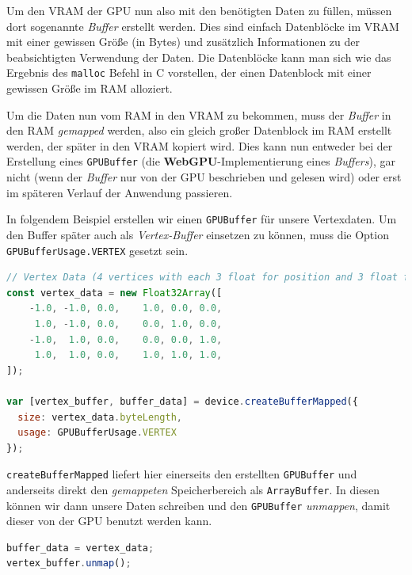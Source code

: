 \documentclass[oneside]{ausarbeitung}
\begin{document}
Um den VRAM der \ac{GPU} nun also mit den benötigten Daten zu füllen, müssen dort sogenannte \textit{Buffer} erstellt werden. Dies sind einfach Datenblöcke im VRAM mit einer gewissen Größe (in Bytes) und zusätzlich Informationen zu der beabsichtigten Verwendung der Daten. Die Datenblöcke kann man sich wie das Ergebnis des \texttt{malloc} Befehl in C vorstellen, der einen Datenblock mit einer gewissen Größe im RAM alloziert.

Um die Daten nun vom RAM in den VRAM zu bekommen, muss der \textit{Buffer} in den RAM \textit{gemapped} werden, also ein gleich großer Datenblock im RAM erstellt werden, der später in den VRAM kopiert wird. Dies kann nun entweder bei der Erstellung eines \texttt{GPUBuffer} (die \textbf{WebGPU}-Implementierung eines \textit{Buffers}), gar nicht (wenn der \textit{Buffer} nur von der \ac{GPU} beschrieben und gelesen wird) oder erst im späteren Verlauf der Anwendung passieren.

In folgendem Beispiel erstellen wir einen \texttt{GPUBuffer} für unsere Vertexdaten. Um den Buffer später auch als \textit{Vertex-Buffer} einsetzen zu können, muss die Option \texttt{GPUBufferUsage.VERTEX} gesetzt sein.

\begin{minipage} {\textwidth}
\begin{lstlisting}[language=JavaScript]
// Vertex Data (4 vertices with each 3 float for position and 3 float for color)
const vertex_data = new Float32Array([
    -1.0, -1.0, 0.0,    1.0, 0.0, 0.0,
     1.0, -1.0, 0.0,    0.0, 1.0, 0.0,
    -1.0,  1.0, 0.0,    0.0, 0.0, 1.0,
     1.0,  1.0, 0.0,    1.0, 1.0, 1.0,
]);

var [vertex_buffer, buffer_data] = device.createBufferMapped({
  size: vertex_data.byteLength,
  usage: GPUBufferUsage.VERTEX
});
\end{lstlisting}
\end{minipage}

\texttt{createBufferMapped} liefert hier einerseits den erstellten \texttt{GPUBuffer} und anderseits direkt den \textit{gemappeten} Speicherbereich als \texttt{ArrayBuffer}. In diesen können wir dann unsere Daten schreiben und den \texttt{GPUBuffer} \textit{unmappen}, damit dieser von der \ac{GPU} benutzt werden kann.
\begin{lstlisting}[language=JavaScript]
buffer_data = vertex_data;
vertex_buffer.unmap();
\end{lstlisting}
\end{document}
